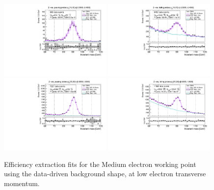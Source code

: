 {\begin{figure}
\centering
\includegraphics[width=0.49\textwidth]{figures/Zee_RecoTemplate_BkgLPiEMu_pass_ptBin0_etaBin0.pdf}
\includegraphics[width=0.49\textwidth]{figures/Zee_RecoTemplate_BkgLPiEMu_fail_ptBin0_etaBin0.pdf}
\includegraphics[width=0.49\textwidth]{figures/Zee_RecoTemplate_BkgLPiEMu_pass_ptBin1_etaBin19.pdf}
\includegraphics[width=0.49\textwidth]{figures/Zee_RecoTemplate_BkgLPiEMu_fail_ptBin1_etaBin19.pdf}
\caption{Efficiency extraction fits for the Medium electron working point using the data-driven background shape, at low electron transverse momentum.}
\label{fig:ZeeNominalFits1}
\end{figure}
\begin{figure}

\end{figure}}
